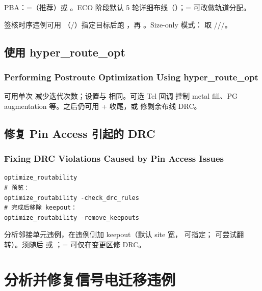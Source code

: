 PBA：=（推荐）或 。ECO 阶段默认 5 轮详细布线（）；= 可改做轨道分配。

签核时序违例可用 （/）指定目标后跑 ，再 。Size-only 模式： 取 ///。

\subsection{使用 hyper\_route\_opt}
\subsubsection*{Performing Postroute Optimization Using hyper\_route\_opt}

可用单次  减少迭代次数；设置与  相同。可选 Tcl 回调  控制 metal fill、PG augmentation 等。之后仍可用 + 收尾，或  修剩余布线 DRC。

\subsection{修复 Pin Access 引起的 DRC}
\subsubsection*{Fixing DRC Violations Caused by Pin Access Issues}

\begin{lstlisting}
optimize_routability
# 预览：
optimize_routability -check_drc_rules
# 完成后移除 keepout：
optimize_routability -remove_keepouts
\end{lstlisting}

分析邻接单元违例，在违例侧加 keepout（默认 site 宽， 可指定； 可尝试翻转）。须随后  或 ；= 可仅在变更区修 DRC。

\section{分析并修复信号电迁移违例}
